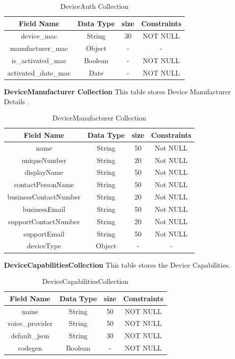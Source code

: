 \begin{table}[hp]
\centering
\begin{tabular}{|c|c|c|c|}
\hline
\textbf{Field Name}  & \textbf{Data Type}  & \textbf{size} &\textbf{Constraints}  \\
\hline
device\_mac & String &	30 & NOT NULL\\
\hline
manufacturer\_mac & Object &	- & -\\
\hline
is\_activated\_mac & Boolean &- & NOT NULL\\
\hline
activated\_date\_mac & Date & - & NOT NULL\\
\hline

\end{tabular}
\caption{DeviceAuth Collection}
\end{table}

\pagebreak
\textbf{DeviceManufacturer Collection} This table stores Device Manufacturer Details .\nolinebreak
\begin{table}[hp]
\centering
\begin{tabular}{|c|c|c|c|}
\hline
\textbf{Field Name}  & \textbf{Data Type}  & \textbf{size} &\textbf{Constraints}  \\
\hline
name &	String &	50 & Not NULL \\\hline
uniqueNumber &	String &	20 & Not NULL \\\hline
displayName &	String &	50 & Not NULL \\\hline
contactPersonName &	String &	50 & Not NULL \\\hline
businessContactNumber &	String &	20 & Not NULL \\\hline
businessEmail &	String &	50 & Not NULL \\\hline
supportContactNumber &	String &	20 & Not NULL \\\hline
supportEmail &	String &	50 & Not NULL \\\hline
deviceType &	Object &	- & - \\\hline



 
\end{tabular}
\caption{DeviceManufacturer Collection}
\end{table}

\textbf{DeviceCapabilitiesCollection} This table stores the Device Capabilities.\nolinebreak
\begin{table}[hp]
\centering
\begin{tabular}{|c|c|c|c|}
\hline
\textbf{Field Name}  & \textbf{Data Type}  & \textbf{size} &\textbf{Constraints}  \\
\hline
name &	String &	50 & NOT NULL \\\hline
voice\_provider &	String &	50 & NOT NULL \\\hline
default\_json &	String &	30 & NOT NULL \\\hline
codegen &	Boolean &	- & NOT NULL \\\hline


 
\end{tabular}
\caption{DeviceCapabilitiesCollection}
\end{table}

